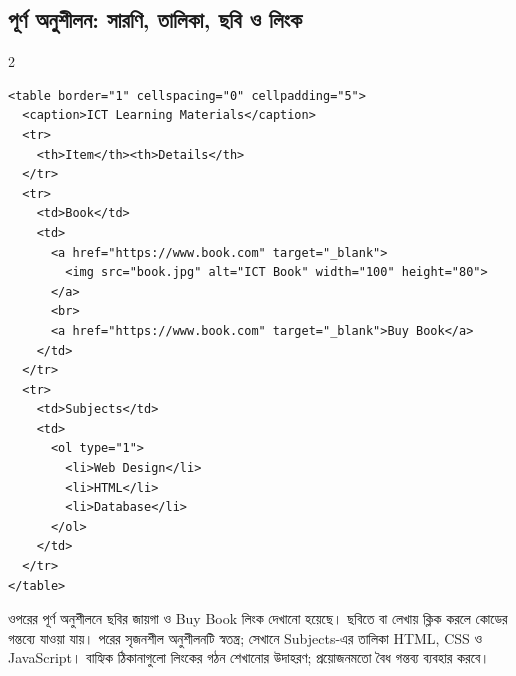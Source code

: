 \subsection{পূর্ণ অনুশীলন: সারণি, তালিকা, ছবি ও লিংক}


\par{}\par
\begin{multicols}{2}
\begin{verbatim}
<table border="1" cellspacing="0" cellpadding="5">
  <caption>ICT Learning Materials</caption>
  <tr>
    <th>Item</th><th>Details</th>
  </tr>
  <tr>
    <td>Book</td>
    <td>
      <a href="https://www.book.com" target="_blank">
        <img src="book.jpg" alt="ICT Book" width="100" height="80">
      </a>
      <br>
      <a href="https://www.book.com" target="_blank">Buy Book</a>
    </td>
  </tr>
  <tr>
    <td>Subjects</td>
    <td>
      <ol type="1">
        <li>Web Design</li>
        <li>HTML</li>
        <li>Database</li>
      </ol>
    </td>
  </tr>
</table>
\end{verbatim}
\end{multicols}


ওপরের পূর্ণ অনুশীলনে ছবির জায়গা ও Buy Book লিংক দেখানো হয়েছে। ছবিতে বা লেখায় ক্লিক করলে কোডের গন্তব্যে যাওয়া যায়। পরের সৃজনশীল অনুশীলনটি স্বতন্ত্র; সেখানে Subjects-এর তালিকা HTML, CSS ও JavaScript। বাহ্যিক ঠিকানাগুলো লিংকের গঠন শেখানোর উদাহরণ; প্রয়োজনমতো বৈধ গন্তব্য ব্যবহার করবে।

